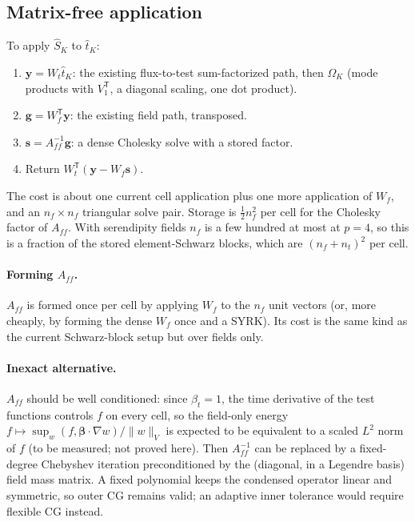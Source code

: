 \documentclass[11pt]{article}
\theoremstyle{remark}
\theoremstyle{definition}
\newcommand{\bbeta}{\boldsymbol{\beta}}
\newcommand{\that}{\hat{t}}
\newcommand{\Shat}{\widehat{S}}
\newcommand{\T}{\mathsf{T}}
\newcommand{\ip}[2]{\left(#1,#2\right)}
\begin{document}
\subsection{Matrix-free application}

To apply $\Shat_K$ to $\that_K$:
\begin{enumerate}[nosep]
  \item $\mathbf y = W_t\that_K$: the existing flux-to-test sum-factorized path, then $\Omega_K$ (mode products with
        $V_1^\T$, a diagonal scaling, one dot product).
  \item $\mathbf g = W_f^\T\mathbf y$: the existing field path, transposed.
  \item $\mathbf s = A_{ff}^{-1}\mathbf g$: a dense Cholesky solve with a stored factor.
  \item Return $W_t^\T(\mathbf y - W_f\mathbf s)$.
\end{enumerate}
The cost is about one current cell application plus one more application of $W_f$, and an $n_f\times n_f$ triangular
solve pair.  Storage is $\tfrac12 n_f^2$ per cell for the Cholesky factor of $A_{ff}$.  With serendipity fields $n_f$
is a few hundred at most at $p=4$, so this is a fraction of the stored element-Schwarz blocks, which are
$(n_f+n_t)^2$ per cell.

\paragraph{Forming $A_{ff}$.}  $A_{ff}$ is formed once per cell by applying $W_f$ to the $n_f$ unit vectors (or, more
cheaply, by forming the dense $W_f$ once and a SYRK).  Its cost is the same kind as the current Schwarz-block setup
but over fields only.

\paragraph{Inexact alternative.}  $A_{ff}$ should be well conditioned: since $\beta_t=1$, the time derivative of the
test functions controls $f$ on every cell, so the field-only energy $f\mapsto\sup_w \ip{f}{\bbeta\cdot\nabla w}/\|w\|_V$
is expected to be equivalent to a scaled $L^2$ norm of $f$ (to be measured; not proved here).  Then $A_{ff}^{-1}$
can be replaced by a fixed-degree Chebyshev iteration preconditioned by the (diagonal, in a Legendre basis) field mass
matrix.  A fixed polynomial keeps the condensed operator linear and symmetric, so outer CG remains valid; an
adaptive inner tolerance would require flexible CG instead.
\end{document}
